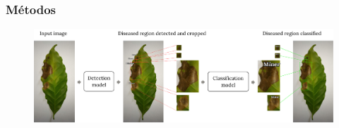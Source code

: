 \documentclass[aspectratio=169]{beamer}
\begin{document}
\begin{frame}
    \frametitle{Métodos}

    \centering
    \begin{figure}
        \centering
        \includegraphics[scale = 0.16]{img/fluxograma-2-estagios.png}
    \end{figure}


\end{frame}



\end{document}
